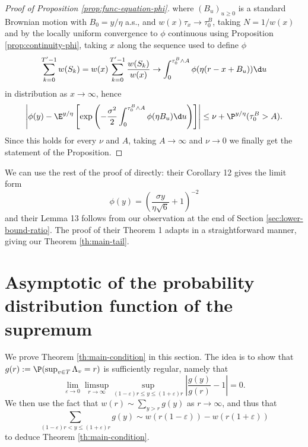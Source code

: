 \documentclass[10pt,a4paper]{article}
\begin{document}
\begin{proof}[Proof of Proposition \ref{prop:func-equation-phi}]
where $(B_u)_{u\geq 0}$ is a standard Brownian motion with $B_0=y/\eta$ a.s., and $w(x) \tau_x \to \tau^B_0$, taking $N = 1/w(x)$ and by the locally uniform convergence to $\phi$ continuous using Proposition \ref{prop:continuity-phi}, taking $x$ along the sequence used to define $\phi$
\[ \sum_{k=0}^{T'-1} w(S_k) = w(x) \sum_{k=0}^{T'-1} \frac{w(S_k)}{w(x)} \to \int_0^{\tau_0^B \wedge A} \phi(\eta (r-x+B_u)) \d u \]
in distribution as $x\to\infty$, hence %
\begin{align*}
\left| \phi(y) - \E^{y/\eta}\left[ \exp\left( - \frac{\sigma^2}{2} \int_0^{\tau_0^B \wedge A} \phi(\eta B_u) \d u \right) \right] \right| \leq \nu + \P^{y/\eta}(\tau^B_0>A)  .
\end{align*}
Since this holds for every $\nu$ and $A$, taking $A\to\infty$ and $\nu\to 0$ we finally get the statement of the Proposition. 
\end{proof}




We can use the rest of the proof of \cite{lalley2015maximal} directly: their Corollary 12 gives the limit form 
\[ \phi(y) = \left( \frac{\sigma y}{\eta\sqrt{6}} +1 \right)^{-2} \]
and their Lemma 13 follows from our observation at the end of Section \ref{sec:lower-bound-ratio}. The proof of their Theorem 1 adapts in a straightforward manner, giving our Theorem \ref{th:main-tail}. 






\section{Asymptotic of the probability distribution function of the supremum}
\label{sec:proof-tail}


We prove Theorem \ref{th:main-condition} in this section. The idea is to show that $g(r) := \P(\sup_{v\in T} \Lambda_v = r)$ is sufficiently regular, namely that 
\[ \lim_{\varepsilon\to 0} \limsup_{r\to\infty} \sup_{(1-\varepsilon)r \leq y \leq (1+\varepsilon)r} \left| \frac{g(y)}{g(r)} - 1 \right| = 0 . \]
We then use the fact that 
$ w(r) \sim \sum_{y>r} g(y) $ as $r\to\infty$, and thus that 
\[ \sum_{(1-\varepsilon)r < y \leq (1+\varepsilon)r} g(y) \sim w(r(1-\varepsilon)) - w(r(1+\varepsilon)) \]
to deduce Theorem \ref{th:main-condition}. 
\end{document}
